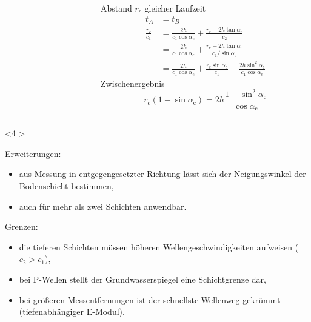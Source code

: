 \begin{frame}
{\begin{columns}
\begin{column}[t]{.5\linewidth}
\end{column}
\begin{column}[t]{.5\linewidth}
Abstand $r_c$ gleicher Laufzeit
\begin{align*}
t_A &= t_B \\
 \frac{r_c}{c_1}  &= \frac{2h}{c_1 \cos\alpha_\mathrm{c}} + \frac{r_c-2h\tan\alpha_\mathrm{c}}{c_2} \\
  &= \frac{2h}{c_1 \cos\alpha_\mathrm{c}} + \frac{r_c-2h\tan\alpha_\mathrm{c}}{c_1/\sin\alpha_\mathrm{c}} \\
 &= \frac{2h}{c_1 \cos\alpha_\mathrm{c}} 
 + \frac{r_c\sin\alpha_\mathrm{c}}{c_1}
 - \frac{2h\sin^2\alpha_\mathrm{c}}{c_1 \cos\alpha_\mathrm{c}}  
\end{align*}
Zwischenergebnis
\begin{equation*}
r_c(1-\sin\alpha_\mathrm{c})=2h\frac{1-\sin^2\alpha_\mathrm{c}}{ \cos\alpha_\mathrm{c}}
\end{equation*}

\end{column}
\end{columns}
}%


\only<4
>{
Erweiterungen: 
\begin{itemize}
 \item aus Messung in entgegengesetzter Richtung lässt sich der Neigungswinkel der Bodenschicht bestimmen,
 \item auch für mehr als zwei Schichten anwendbar.
\end{itemize}
Grenzen:
\begin{itemize}
 \item die tieferen Schichten müssen höheren Wellengeschwindigkeiten aufweisen ($c_2>c_1$),
 \item bei P-Wellen stellt der Grundwasserspiegel eine Schichtgrenze dar,
 \item bei größeren Messentfernungen ist der schnellste Wellenweg gekrümmt (tiefenabhängiger E-Modul).
\end{itemize}
}%

\end{frame}


